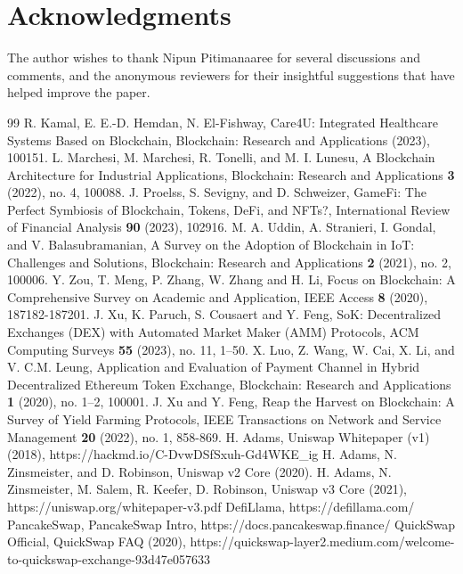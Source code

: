 \documentclass[12pt,a4paper]{article}
\begin{document}
\section*{Acknowledgments}
The author wishes to thank Nipun Pitimanaaree for several discussions and comments, and the anonymous reviewers for their insightful suggestions that have helped improve the paper.

\begin{thebibliography}{99}
R. Kamal, E. E.-D. Hemdan, N. El-Fishway, Care4U: Integrated Healthcare Systems Based on Blockchain, Blockchain: Research and Applications (2023), 100151.
L. Marchesi, M. Marchesi, R. Tonelli, and M. I. Lunesu, A Blockchain Architecture for Industrial Applications, Blockchain: Research and Applications \textbf{3} (2022), no. 4, 100088.
J. Proelss, S. Sevigny, and D. Schweizer, GameFi: The Perfect Symbiosis of Blockchain, Tokens, DeFi, and NFTs?, International Review of Financial Analysis \textbf{90} (2023), 102916.
M. A. Uddin, A. Stranieri, I. Gondal, and V. Balasubramanian, A Survey on the Adoption of Blockchain in IoT: Challenges and Solutions, Blockchain: Research and Applications \textbf{2} (2021), no. 2, 100006.
Y. Zou, T. Meng, P. Zhang, W. Zhang and H. Li, Focus on Blockchain: A Comprehensive Survey on Academic and Application, IEEE Access \textbf{8} (2020), 187182-187201.
J. Xu, K. Paruch, S. Cousaert and Y. Feng, SoK: Decentralized Exchanges (DEX) with Automated Market Maker (AMM) Protocols, ACM Computing Surveys \textbf{55} (2023), no. 11, 1--50.
X. Luo, Z. Wang, W. Cai, X. Li, and V. C.M. Leung, Application and Evaluation of Payment Channel in Hybrid Decentralized Ethereum Token Exchange, Blockchain: Research and Applications \textbf{1} (2020), no. 1--2, 100001.
J. Xu and Y. Feng, Reap the Harvest on Blockchain: A Survey of Yield Farming Protocols, IEEE Transactions on Network and Service Management \textbf{20} (2022), no. 1, 858-869.
H. Adams, Uniswap Whitepaper (v1) (2018), https://hackmd.io/C-DvwDSfSxuh-Gd4WKE\_ig
H. Adams, N. Zinsmeister, and D. Robinson, Uniswap v2 Core (2020).
H. Adams, N. Zinsmeister, M. Salem, R. Keefer, D. Robinson, Uniswap v3 Core (2021), https://uniswap.org/whitepaper-v3.pdf
DefiLlama, https://defillama.com/
PancakeSwap, PancakeSwap Intro, https://docs.pancakeswap.finance/
QuickSwap Official, QuickSwap FAQ (2020), https://quickswap-layer2.medium.com/welcome-to-quickswap-exchange-93d47e057633

\end{thebibliography}
\end{document}
